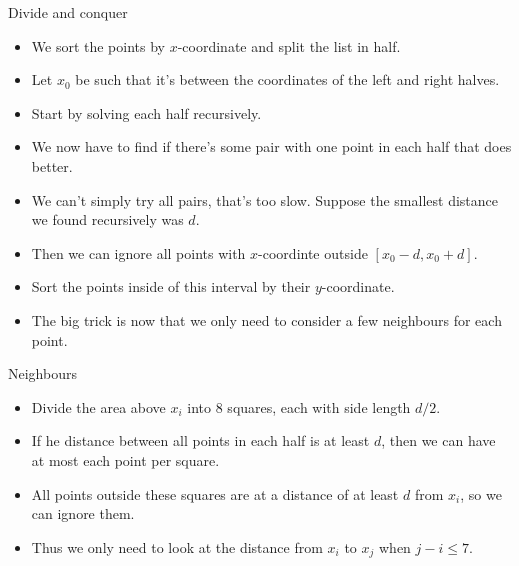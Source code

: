 \documentclass{beamer}
\begin{document}
\begin{frame}[plain]{Divide and conquer}
	\begin{itemize}
        \item We sort the points by $x$-coordinate and split the list in half.
        \item Let $x_0$ be such that it's between the coordinates of the left and right halves.
        \item Start by solving each half recursively.
        \item We now have to find if there's some pair with one point in each half that does better.
        \item We can't simply try all pairs, that's too slow. Suppose the smallest distance we found recursively was $d$.
        \item Then we can ignore all points with $x$-coordinte outside $[x_0 - d, x_0 + d]$.
        \item Sort the points inside of this interval by their $y$-coordinate.
        \item The big trick is now that we only need to consider a few neighbours for each point.
    \end{itemize}
\end{frame}

\begin{frame}[plain]{Neighbours}
	\begin{itemize}
        \item Divide the area above $x_i$ into 8 squares, each with side length $d/2$.
        \item If he distance between all points in each half is at least $d$, then we can have at most each point per square.
        \item All points outside these squares are at a distance of at least $d$ from $x_i$, so we can ignore them.
        \item Thus we only need to look at the distance from $x_i$ to $x_j$ when $j - i \leq 7$.
    \end{itemize}
\end{frame}
\end{document}
